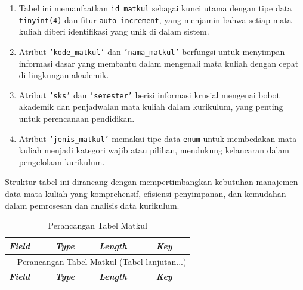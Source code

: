 \begin{enumerate}
	      \begin{enumerate}[label=\alph*.]
		      \item Tabel ini memanfaatkan \texttt{id\_matkul} sebagai kunci utama dengan tipe data \texttt{tinyint(4)} dan fitur \texttt{auto increment}, yang menjamin bahwa setiap mata kuliah diberi identifikasi yang unik di dalam sistem.
		      \item Atribut \texttt{'kode\_matkul'} dan \texttt{'nama\_matkul'} berfungsi untuk menyimpan informasi dasar yang membantu dalam mengenali mata kuliah dengan cepat di lingkungan akademik.
		      \item Atribut \texttt{'sks'} dan \texttt{'semester'} berisi informasi krusial mengenai bobot akademik dan penjadwalan mata kuliah dalam kurikulum, yang penting untuk perencanaan pendidikan.
		      \item Atribut \texttt{'jenis\_matkul'} memakai tipe data \texttt{enum} untuk membedakan mata kuliah menjadi kategori wajib atau pilihan, mendukung kelancaran dalam pengelolaan kurikulum.
	      \end{enumerate}

	      Struktur tabel ini dirancang dengan mempertimbangkan kebutuhan manajemen data mata kuliah yang komprehensif, efisiensi penyimpanan, dan kemudahan dalam pemrosesan dan analisis data kurikulum.

		      {
			      \fontsize{10}{13}\selectfont
			      \begin{longtable}{p{3 cm} p{3cm} p{3 cm} p{3.4 cm}}
				      \caption{Perancangan Tabel Matkul}
				      \label{admin}                                                                                                           \\
				      \hline
				      \textbf{\textit{Field}} & \textbf{\textit{Type}} & \textbf{\textit{Length}}      & \textbf{\textit{Key}}                \\
				      \hline
				      \endfirsthead

				      \multicolumn{4}{c}{\tablename\ \thetable\ {Perancangan Tabel Matkul} \space (Tabel lanjutan...)}                        \\
				      \hline
				      \textbf{\textit{Field}} & \textbf{\textit{Type}} & \textbf{\textit{Length}}      & \textbf{\textit{Key}}                \\
				      \hline
				      \endhead


\end{longtable}}
\end{enumerate}
